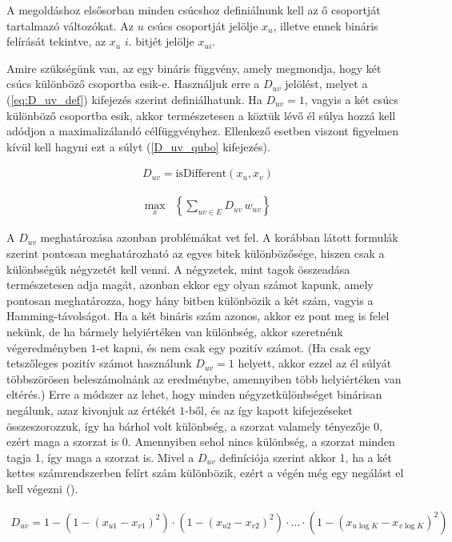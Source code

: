 A megoldáshoz elsősorban minden csúcshoz definiálnunk kell az ő csoportját tartalmazó változókat. Az $u$ csúcs csoportját jelölje $x_u$, illetve ennek bináris felírását tekintve, az $x_u$ $i.$ bitjét jelölje $x_{ui}$.

Amire szükségünk van, az egy bináris függvény, amely megmondja, hogy két csúcs különböző csoportba esik-e. Használjuk erre a $D_{uv}$ jelölést, melyet a (\ref{eq:D_uv_def}) kifejezés szerint definiálhatunk. Ha $D_{uv}=1$, vagyis a két csúcs különböző csoportba esik, akkor természetesen a köztük lévő él súlya hozzá kell adódjon a maximalizálandó célfüggvényhez. Ellenkező esetben viszont figyelmen kívül kell hagyni ezt a súlyt (\ref{D_uv_qubo} kifejezés).

\begin{align}\label{eq:D_uv_def}
D_{uv} = \text{isDifferent}(x_u,x_v)
\end{align}

\begin{align} \label{D_uv_qubo}
	\max_{x} & \left\{\sum _{uv \in E } D_{uv} \, w_{uv} \right\} 
\end{align}

A $D_{uv}$ meghatározása azonban problémákat vet fel. A korábban látott formulák szerint pontosan meghatározható az egyes bitek különbözősége, hiszen csak a különbségük négyzetét kell venni. A négyzetek, mint tagok összeadása természetesen adja magát, azonban ekkor egy olyan számot kapunk, amely pontosan meghatározza, hogy hány bitben különbözik a két szám, vagyis a Hamming-távolságot. Ha a két bináris szám azonos, akkor ez pont meg is felel nekünk, de ha bármely helyiértéken van különbség, akkor szeretnénk végeredményben $1$-et kapni, és nem csak egy pozitív számot. (Ha csak egy tetszőleges pozitív számot használunk $D_{uv}=1$ helyett, akkor ezzel az él súlyát többszörösen beleszámolnánk az eredménybe, amennyiben több helyiértéken van eltérés.) Erre a módszer az lehet, hogy minden négyzetkülönbséget binárisan negálunk, azaz kivonjuk az értékét $1$-ből, és az így kapott kifejezéseket összeszorozzuk, így ha bárhol volt különbség, a szorzat valamely tényezője 0, ezért maga a szorzat is 0. Amennyiben sehol nincs különbség, a szorzat minden tagja 1, így maga a szorzat is. Mivel a $D_{uv}$ definíciója szerint akkor 1, ha a két kettes számrendszerben felírt szám különbözik, ezért a végén még egy negálást el kell végezni ().

\begin{align}\label{eq:D_uv_poli}
	D_{uv} = 1-  \left( 1-(x_{u1}-x_{v1})^2 \right) \cdot \left( 1-(x_{u2}-x_{v2})^2 \right) \cdot ...  \cdot \left( 1-(x_{u\log K}-x_{v \log K})^2 \right) 
\end{align}

